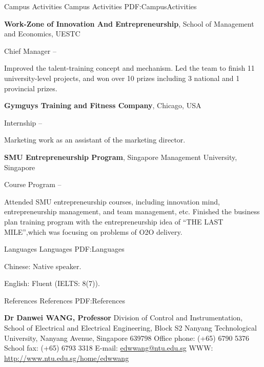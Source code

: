 \documentclass[letterpaper,MMMyyyy,nonstopmode]{simpleresumecv}
\begin{document}
\begin{Body}

\Section
{Campus Activities}
{Campus Activities}
{PDF:CampusActivities}

\Entry
{\textbf{Work-Zone of Innovation And Entrepreneurship}},
School of Management and Economics, 
UESTC

\BulletItem
Chief Manager
\hfill
{} --
\begin{Detail}
\SubBulletItem
Improved the talent-training concept and mechanism.
\SubBulletItem
Led the team to finish 11 university-level projects, and won over 10 prizes including 3 national
 and 1 provincial prizes.
\end{Detail}

\Gap
{\textbf{Gymguys Training and Fitness Company}},
Chicago, 
USA

\BulletItem
Internship
\hfill
{} --
\begin{Detail}
	\SubBulletItem
	Marketing work as an assistant of the marketing director.
\end{Detail}

\Gap
{\textbf{SMU Entrepreneurship Program}},
Singapore Management University,
Singapore

\BulletItem
Course Program
\hfill
{} --
\begin{Detail}
\SubBulletItem
Attended SMU entrepreneurship courses, including innovation mind, entrepreneurship management, and team management, etc.
\SubBulletItem
Finished the business plan training program with the entrepreneurship idea of “THE LAST MILE”,which was focusing on problems of O2O delivery.
\end{Detail}



\Section
{Languages}
{Languages}
{PDF:Languages}

\BulletItem
Chinese: Native speaker.

\Gap
\BulletItem
English: Fluent (IELTS: 8(7)).



\Section
{References}
{References}
{PDF:References}

\Gap
\BulletItem
\textbf{Dr Danwei WANG, Professor}
\newline
Division of Control and Instrumentation,
School of Electrical and Electrical Engineering, Block S2
\newline
Nanyang Technological University,
Nanyang Avenue, Singapore 639798
\newline
Office phone: (+65) 6790 5376
\newline
School fax: (+65) 6793 3318
\newline
E-mail: \url{edwwang@ntu.edu.sg}
\newline
WWW: \url{http://www.ntu.edu.sg/home/edwwang}



\end{Body}
\end{document}
